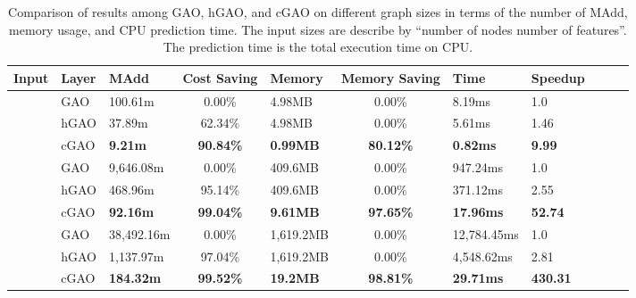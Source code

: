 \documentclass[sigconf]{acmart}
\begin{document}
\begin{table*}[t]
\caption{
Comparison of results among GAO, hGAO, and cGAO on different graph sizes in terms of
the number of MAdd, memory usage, and CPU prediction time. The input sizes are describe
by ``number of nodes  number of features''. The prediction time is the total
execution time on CPU.}
\label{table:layers_cmp}
\begin{tabularx}{\textwidth}{c lx{2.4cm}  cx{2.4cm} cx{2.2cm} Y Y Y Y}
    \hline
    \textbf{Input} & \textbf{Layer} & \textbf{MAdd} & \textbf{Cost Saving} & \textbf{Memory} & \textbf{Memory Saving} & \textbf{Time} & \textbf{Speedup} \\ \hline\hline
     & GAO     & 100.61m   & 0.00\%   & 4.98MB   &  0.00\%     & 8.19ms       & 1.0 \\ & hGAO    & 37.89m  & 62.34\%   & 4.98MB   &  0.00\%     & 5.61ms       & 1.46 \\ & cGAO    & \textbf{9.21m} & \textbf{90.84\%}  & \textbf{0.99MB} & \textbf{80.12\%}  & \textbf{0.82ms} & \textbf{9.99} \\ \hline
     & GAO     & 9,646.08m   & 0.00\%   & 409.6MB  &  0.00\%     & 947.24ms      & 1.0  \\ & hGAO    & 468.96m   & 95.14\%  & 409.6MB  &  0.00\%     & 371.12ms       & 2.55 \\ & cGAO    & \textbf{92.16m} & \textbf{99.04\%} & \textbf{9.61MB} & \textbf{97.65\%} & \textbf{17.96ms} & \textbf{52.74} \\ \hline
     & GAO     & 38,492.16m  & 0.00\%   & 1,619.2MB  & 0.00\%     & 12,784.45ms   & 1.0 \\ & hGAO    & 1,137.97m   & 97.04\%  & 1,619.2MB  & 0.00\%     & 4,548.62ms      & 2.81 \\ & cGAO    & \textbf{184.32m} & \textbf{99.52\%} & \textbf{19.2MB} & \textbf{98.81\%} & \textbf{29.71ms} & \textbf{430.31} \\ \hline
    \hline
\end{tabularx}
\end{table*}
\end{document}
